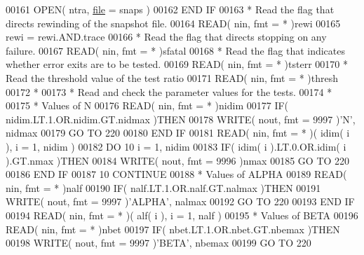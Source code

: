 \begin{DoxyCode}
00161          \textcolor{keyword}{OPEN}( ntra, \hyperlink{structfile}{file} = snaps )
00162 \textcolor{keywordflow}{      END IF}
00163 \textcolor{comment}{*     Read the flag that directs rewinding of the snapshot file.}
00164       \textcolor{keyword}{READ}( nin, fmt = * )rewi
00165       rewi = rewi.AND.trace
00166 \textcolor{comment}{*     Read the flag that directs stopping on any failure.}
00167       \textcolor{keyword}{READ}( nin, fmt = * )sfatal
00168 \textcolor{comment}{*     Read the flag that indicates whether error exits are to be tested.}
00169       \textcolor{keyword}{READ}( nin, fmt = * )tsterr
00170 \textcolor{comment}{*     Read the threshold value of the test ratio}
00171       \textcolor{keyword}{READ}( nin, fmt = * )thresh
00172 \textcolor{comment}{*}
00173 \textcolor{comment}{*     Read and check the parameter values for the tests.}
00174 \textcolor{comment}{*}
00175 \textcolor{comment}{*     Values of N}
00176       \textcolor{keyword}{READ}( nin, fmt = * )nidim
00177       \textcolor{keywordflow}{IF}( nidim.LT.1.OR.nidim.GT.nidmax )\textcolor{keywordflow}{THEN}
00178          \textcolor{keyword}{WRITE}( nout, fmt = 9997 )\textcolor{stringliteral}{'N'}, nidmax
00179          \textcolor{keywordflow}{GO TO} 220
00180 \textcolor{keywordflow}{      END IF}
00181       \textcolor{keyword}{READ}( nin, fmt = * )( idim( i ), i = 1, nidim )
00182       \textcolor{keywordflow}{DO} 10 i = 1, nidim
00183          \textcolor{keywordflow}{IF}( idim( i ).LT.0.OR.idim( i ).GT.nmax )\textcolor{keywordflow}{THEN}
00184             \textcolor{keyword}{WRITE}( nout, fmt = 9996 )nmax
00185             \textcolor{keywordflow}{GO TO} 220
00186 \textcolor{keywordflow}{         END IF}
00187    10 \textcolor{keywordflow}{CONTINUE}
00188 \textcolor{comment}{*     Values of ALPHA}
00189       \textcolor{keyword}{READ}( nin, fmt = * )nalf
00190       \textcolor{keywordflow}{IF}( nalf.LT.1.OR.nalf.GT.nalmax )\textcolor{keywordflow}{THEN}
00191          \textcolor{keyword}{WRITE}( nout, fmt = 9997 )\textcolor{stringliteral}{'ALPHA'}, nalmax
00192          \textcolor{keywordflow}{GO TO} 220
00193 \textcolor{keywordflow}{      END IF}
00194       \textcolor{keyword}{READ}( nin, fmt = * )( alf( i ), i = 1, nalf )
00195 \textcolor{comment}{*     Values of BETA}
00196       \textcolor{keyword}{READ}( nin, fmt = * )nbet
00197       \textcolor{keywordflow}{IF}( nbet.LT.1.OR.nbet.GT.nbemax )\textcolor{keywordflow}{THEN}
00198          \textcolor{keyword}{WRITE}( nout, fmt = 9997 )\textcolor{stringliteral}{'BETA'}, nbemax
00199          \textcolor{keywordflow}{GO TO} 220

\end{DoxyCode}
